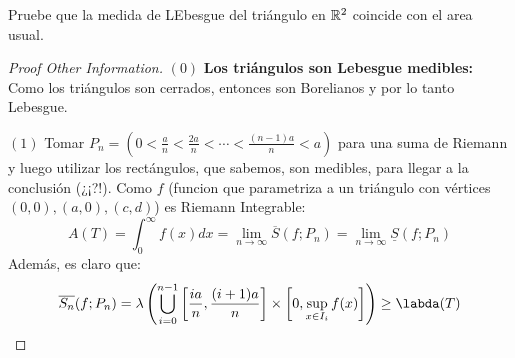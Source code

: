 \noindent Pruebe que la medida de LEbesgue del triángulo en $\mathbb{R}^2$ coincide con el area usual.

\begin{proof}[Proof Other Information]
	$(0)$ \textbf{Los triángulos son Lebesgue medibles:} Como los triángulos son cerrados, entonces son Borelianos y por lo tanto Lebesgue.
	
	$(1)$ Tomar $P_n = ( 0 < \frac{a}{n} < \frac{2a}{n} < \cdots < \frac{(n-1)a}{n} < a)$ para una suma de Riemann y luego utilizar los rectángulos, que sabemos, son medibles, para llegar a la conclusión (¿¡?!). Como $f$ (funcion que parametriza a un triángulo con vértices $(0,0), (a,0), (c,d)$) es Riemann Integrable:
	\[ A(T) = \int_{0}^{\infty} f(x)dx = \lim_{n \to \infty} \overline{S} (f;P_n) = \lim_{n \to \infty}  \underline{S}(f;P_n) \]
	Además, es claro que:
	\[ \overline{S_n}(f;P_n) = \lambda \left( \bigcup_{i=0}^{n-1}\left[ \frac{ia}{n},\frac{(i+1)a}{n} \right] \times \left[ 0,\sup_{x\in I_i} f(x) \right] \right) \geq \labda(T) \]
\end{proof}
